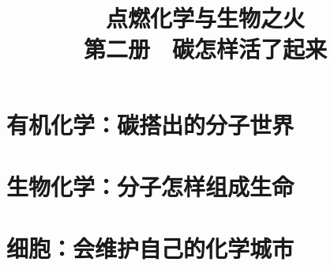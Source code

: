 \documentclass[12pt,openany,fontset=none,UTF8,scheme=chinese]{ctexbook}
\title{点燃化学与生物之火\\第二册　碳怎样活了起来}
\author{}
\date{}
\begin{document}
\frontmatter
\maketitle
\tableofcontents

\mainmatter
\setcounter{part}{4}
\setcounter{chapter}{35}

\part{有机化学：碳搭出的分子世界}










\part{生物化学：分子怎样组成生命}












\part{细胞：会维护自己的化学城市}








\backmatter
\end{document}
